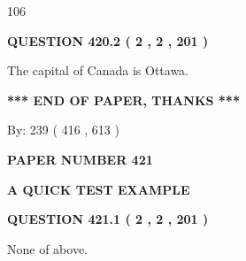 \documentclass[12pt]{article}
\begin{document}
106
 
 
  
\vspace{0.2in}
  
{\textbf{\Large{QUESTION
420.2 
 ( 2 , 2 , 201 )
}}}
  
  
 
 
\noindent{}
 
 
The capital of Canada is Ottawa.
 
 
 
 
   
   
 \vspace{0.2in}
 
   
   
   
   
\vspace{1.0in} 
{\textbf{\large{ *** END OF PAPER, THANKS *** }}} 
   
   
\hspace{1.0in} By: 
 239 ( 416 ,  613 )
   
   
   
   
\newpage 
\setcounter{page}{ 
   421001 } 
   
   
   
   
 {\textbf{ \Large{ PAPER NUMBER  421  }}}
   
   
\vspace{0.2in}
   
   
   
   
   
   
 \vspace{0.2in}
{\LARGE {\textbf{ A QUICK TEST EXAMPLE}}}
   
   
  
\vspace{0.2in}
  
{\textbf{\Large{QUESTION
421.1 
 ( 2 , 2 , 201 )
}}}
  
  
 
 
\noindent{}
 
 
 None of above.
 
 
 
 
  
\vspace{0.2in}
  
\end{document}

